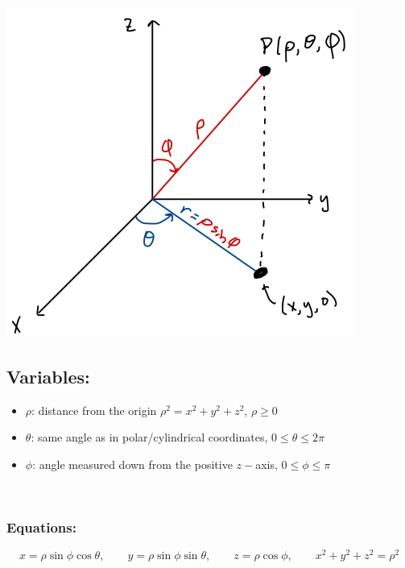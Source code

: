 
\includegraphics[width=\textwidth]{Ch12s7-Spherical-Coordinates.png}
\hspace*{.4in}
\subsection*{Variables:}
\begin{itemize}
\item \(\rho\): distance from the origin \(\rho^2 = x^2+y^2+z^2\), \(\rho \geq 0\)
\item \(\theta\): same angle as in polar/cylindrical coordinates, \(0\leq \theta\leq 2\pi\)
\item \(\phi\): angle measured down from the positive \(z-\)axis, \(0\leq \phi\leq \pi\)
\end{itemize}
~\\

\subsubsection*{Equations:}

\[x=\rho\sin\phi \cos\theta, \qquad y=\rho\sin\phi\sin\theta, \qquad z = \rho\cos\phi, \qquad x^2+y^2+z^2=\rho^2\]


